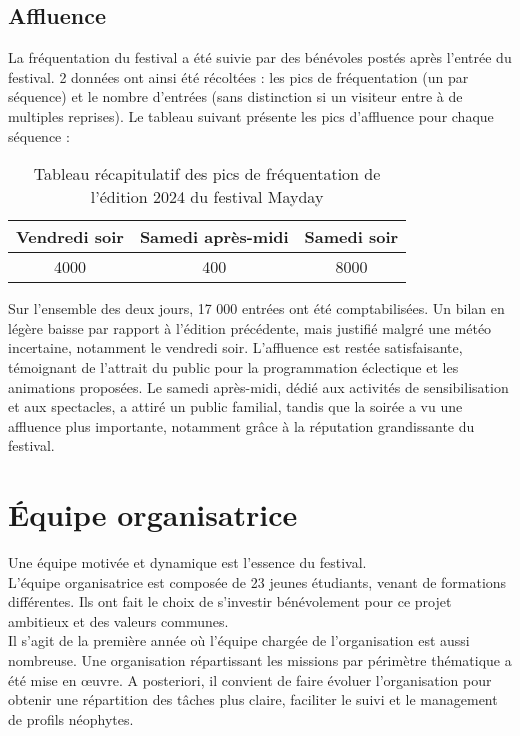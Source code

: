 \documentclass[12pt,a4paper]{report}
\begin{document}
\section{Affluence}
La fréquentation du festival a été suivie par des bénévoles postés après l'entrée du festival. 2 données ont ainsi été récoltées : les pics de fréquentation (un par séquence) et le nombre d'entrées (sans distinction si un visiteur entre à de multiples reprises). Le tableau suivant présente les pics d'affluence pour chaque séquence :
\begin{table}[h!]
\centering
\begin{tabular}{|c|c|c|}
\hline
Vendredi soir & Samedi après-midi & Samedi soir \\
\hline
4000 & 400 & 8000\\
\hline
\end{tabular}
\caption{Tableau récapitulatif des pics de fréquentation de l'édition 2024 du festival Mayday}
\end{table}

Sur l'ensemble des deux jours, 17 000 entrées ont été comptabilisées. Un bilan en légère baisse par rapport à l'édition précédente, mais justifié malgré une météo incertaine, notamment le vendredi soir. L'affluence est restée satisfaisante, témoignant de l'attrait du public pour la programmation éclectique et les animations proposées. Le samedi après-midi, dédié aux activités de sensibilisation et aux spectacles, a attiré un public familial, tandis que la soirée a vu une affluence plus importante, notamment grâce à la réputation grandissante du festival.

\chapter{Équipe organisatrice}

Une équipe motivée et dynamique est l'essence du festival.\\

L’équipe organisatrice est composée de 23 jeunes étudiants, venant de formations différentes. Ils ont fait le choix de s’investir bénévolement pour ce projet ambitieux et des valeurs communes.\\

Il s'agit de la première année où l'équipe chargée de l'organisation est aussi nombreuse. Une organisation répartissant les missions par périmètre thématique a été mise en œuvre. A posteriori, il convient de faire évoluer l'organisation pour obtenir une répartition des tâches plus claire, faciliter le suivi et le management de profils néophytes.\\
\end{document}
